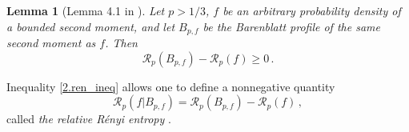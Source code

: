 \documentclass[12pt]{amsart}
\newcommand{\renyi}{{\mathcal{R}}}
\theoremstyle{plain}
\newtheorem{lemma}[theorem]{Lemma}
\theoremstyle{definition}
\theoremstyle{remark}
\begin{document}
\begin{lemma}[Lemma 4.1 in \cite{CaTo14}]
    Let $p>1/3$, $f$ be an arbitrary probability density of a bounded second moment, and let $B_{p,f}$ be the Barenblatt profile of the same second moment as $f$. Then
    \begin{equation}\label{2.ren_ineq}
        \renyi_p(B_{p,f}) - \renyi_p(f) \geq 0\,.
    \end{equation}
\end{lemma}
\noindent Inequality \eqref{2.ren_ineq} allows one to define a nonnegative quantity 
\begin{equation*}
    \renyi_p(f|B_{p,f}) = \renyi_p(B_{p,f}) - \renyi_p(f)\,,
\end{equation*}
called {\em the relative R\'enyi entropy} \cite{CaTo14}. 
\end{document}
